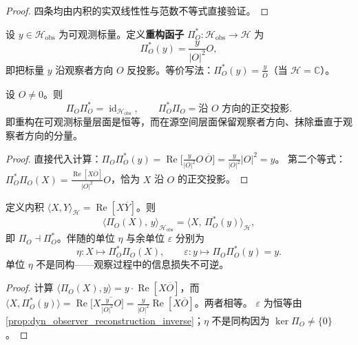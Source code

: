 \begin{proof}
四条均由内积的实双线性性与范数不等式直接验证。
\end{proof}

\begin{definition}[重构函子]\label{def:dyn_reconstruction_functor}
设 $y\in\mathcal H_{\text{obs}}$ 为可观测标量。定义\textbf{重构函子} $\Pi_O^\ast:\mathcal H_{\text{obs}}\to\mathcal H$ 为
\[
\Pi_O^\ast(y)=\frac{y}{|O|^2}O,
\]
即把标量 $y$ 沿观察者方向 $O$ 反投影。等价写法：$\Pi_O^\ast(y)=\frac{y}{\overline{O}}$（当 $\mathcal H=\mathbb C$）。
\end{definition}

\begin{proposition}[观察—重构互逆条件]\label{prop:dyn_observer_reconstruction_inverse}
设 $O\neq 0$。则
\[
\Pi_O\Pi_O^\ast=\operatorname{id}_{\mathcal H_{\text{obs}}},\qquad
\Pi_O^\ast\Pi_O=\text{沿 }O\text{ 方向的正交投影}.
\]
即重构在可观测标量层面是恒等，而在源空间层面保留观察者方向、抹除垂直于观察者方向的分量。
\end{proposition}

\begin{proof}
直接代入计算：$\Pi_O\Pi_O^\ast(y)=\operatorname{Re}\big[\tfrac{y}{|O|^2}O\,\overline O\big]=\tfrac{y}{|O|^2}|O|^2=y$。
第二个等式：$\Pi_O^\ast\Pi_O(X)=\tfrac{\operatorname{Re}[X\overline O]}{|O|^2}O$，恰为 $X$ 沿 $O$ 的正交投影。
\end{proof}

\begin{theorem}[观察者函子与重构函子的伴随性]\label{thm:dyn_observer_adjunction}
定义内积 $\langle X,Y\rangle_{\mathcal H}=\operatorname{Re}[X\overline Y]$。则
\[
\langle \Pi_O(X),\,y\rangle_{\mathcal H_{\text{obs}}}=\langle X,\,\Pi_O^\ast(y)\rangle_{\mathcal H},
\]
即 $\Pi_O\dashv\Pi_O^\ast$。伴随的单位 $\eta$ 与余单位 $\varepsilon$ 分别为
\[
\eta:X\mapsto\Pi_O^\ast\Pi_O(X),\qquad
\varepsilon:y\mapsto\Pi_O\Pi_O^\ast(y)=y.
\]
单位 $\eta$ 不是同构——观察过程中的信息损失不可逆。
\end{theorem}

\begin{proof}
计算 $\langle \Pi_O(X),y\rangle=y\cdot\operatorname{Re}[X\overline O]$，而
$\langle X,\Pi_O^\ast(y)\rangle=\operatorname{Re}\big[X\overline{\tfrac{y}{|O|^2}O}\big]=\tfrac{y}{|O|^2}\operatorname{Re}[X\overline O]$。两者相等。
$\varepsilon$ 为恒等由 \cref{prop:dyn_observer_reconstruction_inverse}；$\eta$ 不是同构因为 $\ker\Pi_O\neq\{0\}$。
\end{proof}

